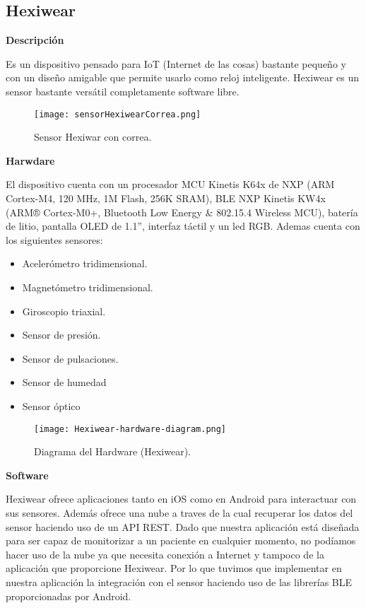\documentclass[11pt,spanish]{article}
\begin{document}
\subsection{Hexiwear}
{\bf Descripción}
\newline

Es un dispositivo pensado para IoT (Internet de las cosas) bastante pequeño y con un diseño amigable que permite usarlo como reloj inteligente. Hexiwear es un sensor bastante versátil completamente software libre.
\newline

\begin{figure}[h!]
  \centering
  \texttt{[image: sensorHexiwearCorrea.png]}
  \caption{Sensor Hexiwar con correa.}
\end{figure}
\newpage

{\bf Harwdare}
\newline

El dispositivo cuenta con un procesador MCU Kinetis K64x de NXP (ARM Cortex-M4, 120 MHz, 1M Flash, 256K SRAM), BLE NXP Kinetis KW4x (ARM® Cortex-M0+, Bluetooth Low Energy \& 802.15.4 Wireless MCU), batería de litio, pantalla OLED
de 1.1'', interfaz táctil y un led RGB. Ademas cuenta con los siguientes sensores:

\begin{itemize}
  \item Acelerómetro tridimensional.
  \item Magnetómetro tridimensional.
  \item Giroscopio triaxial.
  \item Sensor de presión.
  \item Sensor de pulsaciones.
  \item Sensor de humedad
  \item Sensor óptico
\end{itemize}

\begin{figure}[H]
  \centering
  \texttt{[image: Hexiwear-hardware-diagram.png]}
  \caption{Diagrama del Hardware (Hexiwear).}
\end{figure}

{\bf Software}
\newline

Hexiwear ofrece aplicaciones tanto en iOS como en Android para interactuar con sus sensores. Además ofrece una nube a traves de la cual recuperar los datos del sensor haciendo uso de un API REST. Dado que nuestra aplicación está diseñada para ser capaz de monitorizar a un paciente en cualquier momento, no podíamos hacer uso de la nube ya que necesita conexión a Internet y tampoco de la aplicación que proporcione Hexiwear.  Por lo que tuvimos que implementar en nuestra aplicación la integración con el sensor haciendo uso de las librerías BLE proporcionadas por Android.
\newline
\end{document}
